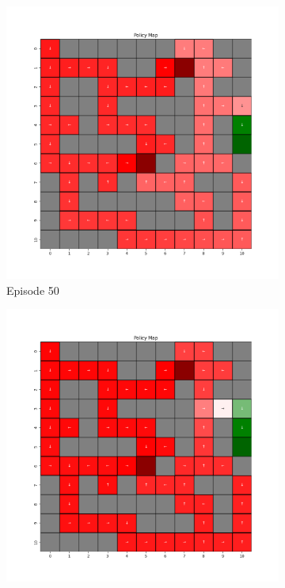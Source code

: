 \documentclass{assignment}
\begin{document}
\begin{figure}[H]
\begin{subfigure}{0.3\textwidth}
        \includegraphics[width=\textwidth]{figures/policy_q/alpha_sweep/policy_alpha_0.1_gamma_0.95_epsilon_0.2_iteration_50.png}
    \caption{Episode 50}
    \end{subfigure}\hfill
    \begin{subfigure}{0.3\textwidth}
        \includegraphics[width=\textwidth]{figures/policy_q/alpha_sweep/policy_alpha_0.1_gamma_0.95_epsilon_0.2_iteration_100.png}

\end{subfigure}
\end{figure}
\end{document}
